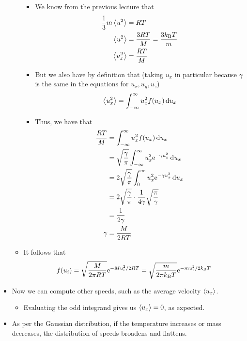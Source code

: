 \documentclass[../notes.tex]{subfiles}
\begin{document}
\begin{itemize}
\begin{itemize}
\begin{itemize}
            \item We know from the previous lecture that
            \begin{align*}
                \frac{1}{3}m\prb{u^2} &= RT\\
                \prb{u^2} &= \frac{3RT}{M} = \frac{3\kB T}{m}\\
                \prb{u_x^2} &= \frac{RT}{M}
            \end{align*}
            \item But we also have by definition that (taking $u_x$ in particular because $\gamma$ is the same in the equations for $u_x,u_y,u_z$)
            \begin{equation*}
                \prb{u_x^2} = \int_{-\infty}^\infty u_x^2f(u_x)\dd{u_x}
            \end{equation*}
            \item Thus, we have that
            \begin{align*}
                \frac{RT}{M} &= \int_{-\infty}^\infty u_x^2f(u_x)\dd{u_x}\\
                &= \sqrt{\frac{\gamma}{\pi}}\int_{-\infty}^\infty u_x^2\e[-\gamma u_x^2]\dd{u_x}\\
                &= 2\sqrt{\frac{\gamma}{\pi}}\int_0^\infty u_x^2\e[-\gamma u_x^2]\dd{u_x}\\
                &= 2\sqrt{\frac{\gamma}{\pi}}\cdot\frac{1}{4\gamma}\sqrt{\frac{\pi}{\gamma}}\\
                &= \frac{1}{2\gamma}\\
                \gamma &= \frac{M}{2RT}
            \end{align*}
        \end{itemize}
        \item It follows that
        \begin{equation*}
            f(u_i) = \sqrt{\frac{M}{2\pi RT}}\e[-Mu_i^2/2RT]
            = \sqrt{\frac{m}{2\pi\kB T}}\e[-mu_i^2/2\kB T]
        \end{equation*}
    \end{itemize}
    \item Now we can compute other speeds, such as the average velocity $\prb{u_x}$.
    \begin{itemize}
        \item Evaluating the odd integrand gives us $\prb{u_x}=0$, as expected.
    \end{itemize}
    \item As per the Gaussian distribution, if the temperature increases or mass decreases, the distribution of speeds broadens and flattens.

\end{itemize}
\end{document}
